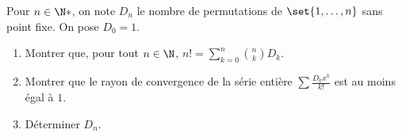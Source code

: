\begin{enonce}
\begin{exercise}[ID={RMS127 E744},subtitle={Mines-Ponts PSI 2016},tags={}]
  Pour $n\in\N*$, on note $D_n$ le nombre de permutations de $\set{1,\dots,n}$ sans point fixe.
  On pose $D_0 = 1$.

  \begin{enumerate}
    \item 
      Montrer que, pour tout $n\in\N$, $n!= \sum_{k=0}^n \binom nk D_k$.

    \item 
      Montrer que le rayon de convergence de la série entière $\sum \frac{D_k x^k}{k!}$ est au moins égal à $1$.

    \item
      Déterminer $D_n$.
  \end{enumerate}
\end{exercise}
\begin{solution}
\end{solution}
\end{enonce}

